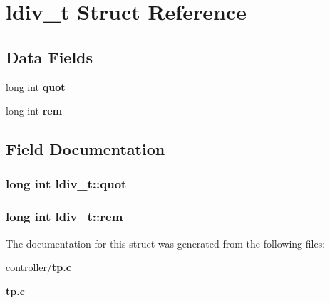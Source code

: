 \section{ldiv\_\-t Struct Reference}
\label{structldiv__t}
\subsection*{Data Fields}
\begin{DoxyCompactItemize}
\item 
long int {\bf quot}
\item 
long int {\bf rem}
\end{DoxyCompactItemize}


\subsection{Field Documentation}
\subsubsection[{quot}]{\setlength{\rightskip}{0pt plus 5cm}long int {\bf ldiv\_\-t::quot}}\label{structldiv__t_ac56cf5939abb521a3a0c48f422b72271}
\subsubsection[{rem}]{\setlength{\rightskip}{0pt plus 5cm}long int {\bf ldiv\_\-t::rem}}\label{structldiv__t_a66737a893b8872671393a49aaf568cb1}


The documentation for this struct was generated from the following files:\begin{DoxyCompactItemize}
\item 
controller/{\bf tp.c}\item 
{\bf tp.c}\end{DoxyCompactItemize}
